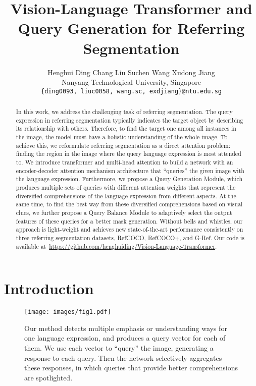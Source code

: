 \documentclass[10pt,twocolumn,letterpaper]{article}
\begin{document}
\title{Vision-Language Transformer and Query Generation for Referring Segmentation}
\author{
Henghui Ding\footnotemark[1]
\quad
Chang Liu\footnotemark[1]
\quad
Suchen Wang
\quad
Xudong Jiang\\
Nanyang Technological University, Singapore\\
{\tt\small \{ding0093, liuc0058, wang.sc, exdjiang\}@ntu.edu.sg}
}
\maketitle
\renewcommand{\thefootnote}{\fnsymbol{footnote}}




\begin{abstract}
   In this work, we address the challenging task of referring segmentation. The query expression in referring segmentation typically indicates the target object by describing its relationship with others. Therefore, to find the target one among all instances in the image, the model must have a holistic understanding of the whole image. To achieve this, we reformulate referring segmentation as a direct attention problem: finding the region in the image where the query language expression is most attended to. We introduce transformer and multi-head attention to build a network with an encoder-decoder attention mechanism architecture that ``queries'' the given image with the language expression. Furthermore, we propose a Query Generation Module, which produces multiple sets of queries with different attention weights that represent the diversified comprehensions of the language expression from different aspects. At the same time, to find the best way from these diversified comprehensions based on visual clues, we further propose a Query Balance Module to adaptively select the output features of these queries for a better mask generation. Without bells and whistles, our approach is light-weight and achieves new state-of-the-art performance consistently on three referring segmentation datasets, RefCOCO, RefCOCO+, and G-Ref. Our code is available at~\href{https://github.com/henghuiding/Vision-Language-Transformer}{https://github.com/henghuiding/Vision-Language-Transformer}.
\end{abstract}

\section{Introduction}

\begin{figure}[t]
   \begin{center}
      \texttt{[image: images/fig1.pdf]}
   \end{center}
    \vspace{-0.1in}
   \caption{Our method detects multiple emphasis or understanding ways for one language expression, and produces a query vector for each of them. We use each vector to ``query'' the image, generating a response to each query. Then the network selectively aggregates these responses, in which queries that provide better comprehensions are spotlighted.}
   \label{fig:fig1}
\end{figure}
\end{document}
